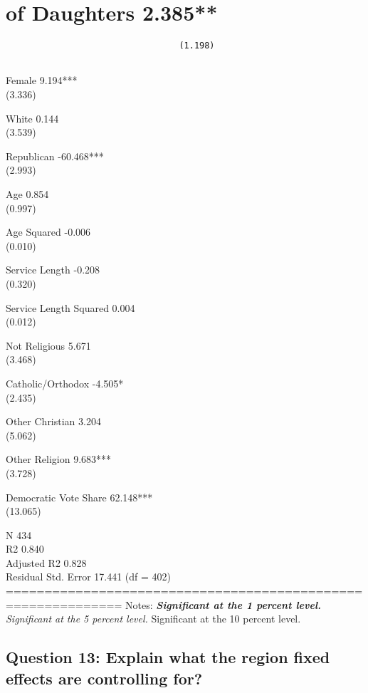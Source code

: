 \documentclass[
]{article}
\begin{document}
\hypertarget{of-daughters-2.385}{%
\section{of Daughters 2.385**}\label{of-daughters-2.385}}

\begin{verbatim}
                                  (1.198)                
                                                         
\end{verbatim}

Female 9.194***\\
(3.336)

White 0.144\\
(3.539)

Republican -60.468***\\
(2.993)

Age 0.854\\
(0.997)

Age Squared -0.006\\
(0.010)

Service Length -0.208\\
(0.320)

Service Length Squared 0.004\\
(0.012)

Not Religious 5.671\\
(3.468)

Catholic/Orthodox -4.505*\\
(2.435)

Other Christian 3.204\\
(5.062)

Other Religion 9.683***\\
(3.728)

Democratic Vote Share 62.148***\\
(13.065)

N 434\\
R2 0.840\\
Adjusted R2 0.828\\
Residual Std. Error 17.441 (df = 402)\\
============================================================= Notes:
\emph{\textbf{Significant at the 1 percent level. }Significant at the 5
percent level. }Significant at the 10 percent level.

\hypertarget{question-13-explain-what-the-region-fixed-effects-are-controlling-for}{%
\subsection{Question 13: Explain what the region fixed effects are
controlling
for?}\label{question-13-explain-what-the-region-fixed-effects-are-controlling-for}}
\end{document}
